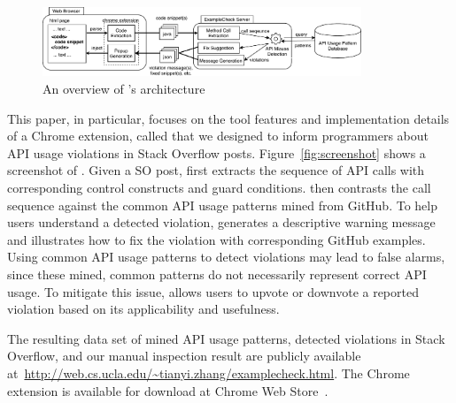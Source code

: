 \begin{figure}[!th]
\centering
\includegraphics[width=0.85\textwidth]{examplecheck-extension.pdf}
\caption{An overview of {\tool}'s architecture}
\label{fig:arch}
\end{figure}

This paper, in particular, focuses on the tool features and implementation details of a Chrome extension, called {\tool} that we designed to inform programmers about API usage violations in Stack Overflow posts. Figure~\ref{fig:screenshot} shows a screenshot of {\tool}. Given a SO post, {\tool} first extracts the sequence of API calls with corresponding control constructs and guard conditions. {\tool} then contrasts the call sequence against the common API usage patterns mined from GitHub. To help users understand a detected violation, {\tool} generates a descriptive warning message and illustrates how to fix the violation with corresponding GitHub examples. Using common API usage patterns to detect violations may lead to false alarms, since these mined, common patterns do not necessarily represent correct API usage. To mitigate this issue, {\tool} allows users to upvote or downvote a reported violation based on its applicability and usefulness. 

The resulting data set of mined API usage patterns, detected violations in Stack Overflow, and our manual inspection result are publicly available at~{\small\url{http://web.cs.ucla.edu/~tianyi.zhang/examplecheck.html}}. The Chrome extension is available for download at Chrome Web Store~\cite{examplecheck}.



%
